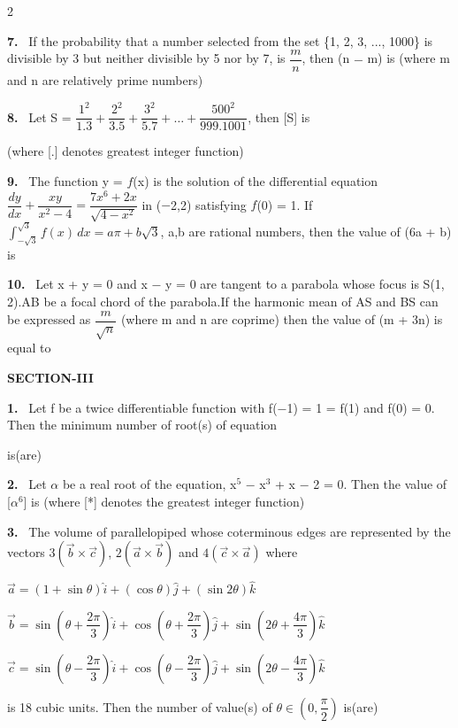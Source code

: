 \documentclass[10pt]{extarticle}
\newcommand{\sect}[1]{\par\smallskip\noindent\textbf{#1}\par}
\newcommand{\qn}[1]{\par\smallskip\noindent\textbf{#1.}~}
\begin{document}
\begin{multicols}{2}
\qn{7} If the probability that a number selected from the set \{1, 2, 3, ..., 1000\} is divisible by 3 but neither divisible by 5 nor by 7, is $\dfrac{m}{n}$, then (n $-$ m) is (where m and n are relatively prime numbers)\par
\qn{8} Let S = $\dfrac{1^2}{1.3}+\dfrac{2^2}{3.5}+\dfrac{3^2}{5.7}+\ldots+\dfrac{500^2}{999.1001}$, then [S] is\par
(where [.] denotes greatest integer function)\par
\qn{9} The function y = $f$(x) is the solution of the differential equation $\dfrac{dy}{dx}+\dfrac{xy}{x^2-4}=\dfrac{7x^6+2x}{\sqrt{4-x^2}}$ in ($-$2,2) satisfying $f$(0) = 1. If $\displaystyle\int_{-\sqrt{3}}^{\sqrt{3}} f(x)\,dx = a\pi+b\sqrt{3}$, a,b are rational numbers, then the value of (6a + b) is\par
\qn{10} Let x + y = 0 and x $-$ y = 0 are tangent to a parabola whose focus is S(1, 2).AB be a focal chord of the parabola.If the harmonic mean of AS and BS can be expressed as $\dfrac{m}{\sqrt{n}}$ (where m and n are coprime) then the value of (m + 3n) is equal to\par
\sect{SECTION-III}
\qn{1} Let f be a twice differentiable function with f($-$1) = 1 = f(1) and f(0) = 0. Then the minimum number of root(s) of equation\par
{}\par
is(are)\par
\qn{2} Let $\alpha$ be a real root of the equation, x$^5$ $-$ x$^3$ + x $-$ 2 = 0. Then the value of [$\alpha^6$] is (where [*] denotes the greatest integer function)\par
\qn{3} The volume of parallelopiped whose coterminous edges are represented by the vectors $3\left(\vec{b}\times\vec{c}\right)$, $2\left(\vec{a}\times\vec{b}\right)$ and $4\left(\vec{c}\times\vec{a}\right)$ where\par
$\vec{a}=(1+\sin\theta)\hat{i}+(\cos\theta)\hat{j}+(\sin2\theta)\hat{k}$\par
$\vec{b}=\sin\left(\theta+\dfrac{2\pi}{3}\right)\hat{i}+\cos\left(\theta+\dfrac{2\pi}{3}\right)\hat{j}+\sin\left(2\theta+\dfrac{4\pi}{3}\right)\hat{k}$\par
$\vec{c}=\sin\left(\theta-\dfrac{2\pi}{3}\right)\hat{i}+\cos\left(\theta-\dfrac{2\pi}{3}\right)\hat{j}+\sin\left(2\theta-\dfrac{4\pi}{3}\right)\hat{k}$\par
is 18 cubic units. Then the number of value(s) of $\theta\in\left(0,\dfrac{\pi}{2}\right)$ is(are)\par

\end{multicols}
\end{document}
